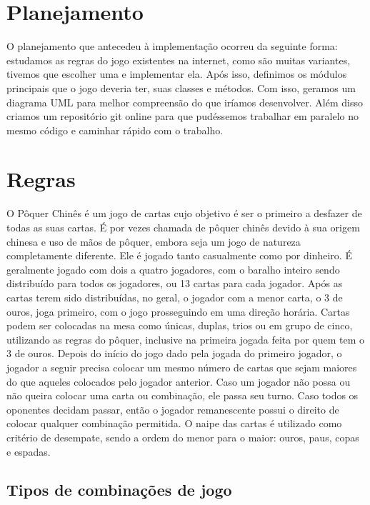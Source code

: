 \documentclass[12pt]{article}
\begin{document}
\section{Planejamento}
\label{planejamento}

O planejamento que antecedeu à implementação ocorreu da seguinte forma: estudamos as regras do jogo existentes na internet, como são muitas variantes, tivemos que escolher uma e implementar ela. Após isso, definimos os módulos principais que o jogo deveria ter, suas classes e métodos. Com isso, geramos um diagrama UML para melhor compreensão do que iríamos desenvolver. Além disso criamos um repositório git online para que pudéssemos trabalhar em paralelo no mesmo código e caminhar rápido com o trabalho.

\section{Regras}
\label{regras}

O Pôquer Chinês \cite{bigtwo} é um jogo de cartas cujo objetivo é ser o primeiro a desfazer de todas as suas cartas. É por vezes chamada de pôquer chinês devido à sua origem chinesa e uso de mãos de pôquer, embora seja um jogo de natureza completamente diferente.
Ele é jogado tanto casualmente como por dinheiro. É geralmente jogado com dois a quatro jogadores, com o baralho inteiro sendo distribuído para todos os jogadores, ou 13 cartas para cada jogador.
Após as cartas terem sido distribuídas, no geral, o jogador com a menor carta, o 3 de ouros, joga primeiro, com o jogo prosseguindo em uma direção horária. Cartas podem ser colocadas na mesa como únicas, duplas, trios ou em grupo de cinco, utilizando as regras do pôquer, inclusive na primeira jogada feita por quem tem o 3 de ouros.
Depois do início do jogo dado pela jogada do primeiro jogador, o jogador a seguir precisa colocar um mesmo número de cartas que sejam maiores do que aqueles colocados pelo jogador anterior. Caso um jogador não possa ou não queira colocar uma carta ou combinação, ele passa seu turno. Caso todos os oponentes decidam passar, então o jogador remanescente possui o direito de colocar qualquer combinação permitida. O naipe das cartas é utilizado como critério de desempate, sendo a ordem do menor para o maior: ouros, paus, copas e espadas.

\subsection{Tipos de combinações de jogo}
\vspace{0.2 true cm}
\end{document}
